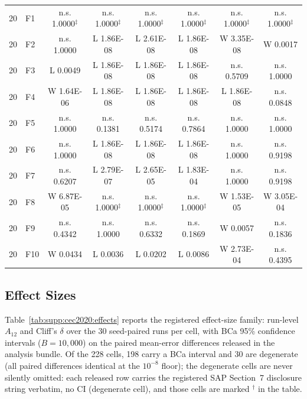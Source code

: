 \documentclass[algorithms,article,submit,moreauthors,pdftex]{Definitions/mdpi}
\begin{document}
\begin{table}[p]
{\begin{tabular}{clcccccc}
\midrule
20 & F1 & n.s. 1.0000$^{\ddagger}$ & n.s. 1.0000$^{\ddagger}$ & n.s. 1.0000$^{\ddagger}$ & n.s. 1.0000$^{\ddagger}$ & n.s. 1.0000$^{\ddagger}$ & n.s. 1.0000$^{\ddagger}$ \\
20 & F2 & n.s. 1.0000 & L 1.86E-08 & L 2.61E-08 & L 1.86E-08 & W 3.35E-08 & W 0.0017 \\
20 & F3 & L 0.0049 & L 1.86E-08 & L 1.86E-08 & L 1.86E-08 & n.s. 0.5709 & n.s. 1.0000 \\
20 & F4 & W 1.64E-06 & L 1.86E-08 & L 1.86E-08 & L 1.86E-08 & L 1.86E-08 & n.s. 0.0848 \\
20 & F5 & n.s. 1.0000 & n.s. 0.1381 & n.s. 0.5174 & n.s. 0.7864 & n.s. 1.0000 & n.s. 1.0000 \\
20 & F6 & n.s. 1.0000 & L 1.86E-08 & L 1.86E-08 & L 1.86E-08 & n.s. 1.0000 & n.s. 0.9198 \\
20 & F7 & n.s. 0.6207 & L 2.79E-07 & L 2.65E-05 & L 1.83E-04 & n.s. 1.0000 & n.s. 0.9198 \\
20 & F8 & W 6.87E-05 & n.s. 1.0000$^{\ddagger}$ & n.s. 1.0000$^{\ddagger}$ & n.s. 1.0000$^{\ddagger}$ & W 1.53E-05 & W 3.05E-04 \\
20 & F9 & n.s. 0.4342 & n.s. 1.0000 & n.s. 0.6332 & n.s. 0.1869 & W 0.0057 & n.s. 0.1836 \\
20 & F10 & W 0.0434 & L 0.0036 & L 0.0202 & L 0.0086 & W 2.73E-04 & n.s. 0.4395 \\
\bottomrule
\end{tabular}}
\end{table}

\subsection{Effect Sizes}\label{sec:supp:cec2020:effects}

Table~\ref{tab:supp:cec2020:effects} reports the registered effect-size
family: run-level $A_{12}$ and Cliff's $\delta$ over the 30 seed-paired
runs per cell, with BCa 95\% confidence intervals ($B = 10{,}000$) on
the paired mean-error differences released in the analysis bundle.  Of
the 228 cells, 198 carry a BCa interval and 30 are degenerate (all paired
differences identical at the $10^{-8}$ floor); the degenerate cells are
never silently omitted: each released row carries the registered SAP
Section~7 disclosure string verbatim, no CI (degenerate cell), and those
cells are marked $^{\dagger}$ in the table.
\end{document}

